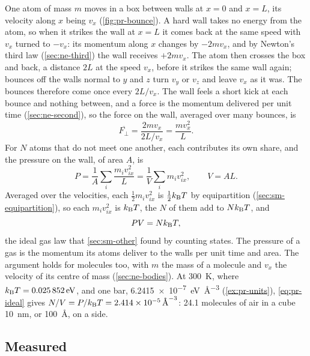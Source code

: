 One atom of mass $m$ moves in a box between walls at $x = 0$ and $x =
L$, its velocity along $x$ being $v_x$ (\cref{fig:pr-bounce}). A hard
wall takes no energy from the atom, so when it strikes the wall at $x =
L$ it comes back at the same speed with $v_x$ turned to $-v_x$: its
momentum along $x$ changes by $-2mv_x$, and by Newton's third law
(\cref{sec:ne-third}) the wall receives $+2mv_x$. The atom then crosses
the box and back, a distance $2L$ at the speed $v_x$, before it strikes
the same wall again; bounces off the walls normal to $y$ and $z$ turn
$v_y$ or $v_z$ and leave $v_x$ as it was. The bounces therefore come once
every $2L/v_x$. The wall feels a short kick at each bounce and nothing
between, and a force is the momentum delivered per unit time
(\cref{sec:ne-second}), so the force on the wall, averaged over many
bounces, is
\begin{equation*}
   \overline{F_\perp} = \frac{2mv_x}{2L/v_x} = \frac{mv_x^2}{L} .
\end{equation*}
For $N$ atoms that do not meet one another, each contributes its own
share, and the pressure on the wall, of area $A$, is
\begin{equation*}
   P = \frac{1}{A}\sum_i\frac{m_iv_{ix}^2}{L} = \frac{1}{V}\sum_i
   m_iv_{ix}^2 , \qquad V = AL .
\end{equation*}
Averaged over the velocities, each $\frac12m_iv_{ix}^2$ is $\frac12k_{\mathrm{B}} T$
by equipartition (\cref{sec:sm-equipartition}), so each $m_iv_{ix}^2$ is
$k_{\mathrm{B}} T$, the $N$ of them add to $Nk_{\mathrm{B}} T$, and
\begin{equation}
   PV = Nk_{\mathrm{B}} T ,
   \label{eq:pr-ideal}
\end{equation}
the ideal gas law that \cref{sec:sm-other} found by counting states. The
pressure of a gas is the momentum its atoms deliver to the walls per unit
time and area. The argument holds for molecules too, with $m$ the mass of
a molecule and $v_x$ the velocity of its centre of mass
(\cref{sec:ne-bodies}). At \SI{300}{\kelvin}, where $k_{\mathrm{B}} T =
\SI{0.025852}{\electronvolt}$, and one bar,
\SI{6.2415e-7}{\electronvolt\per\angstrom\cubed} (\cref{ex:pr-units}),
\cref{eq:pr-ideal} gives $N/V = P/k_{\mathrm{B}} T = \SI{2.414e-5}{\per\angstrom
\cubed}$: 24.1 molecules of air in a cube \SI{10}{\nano\metre}, or
\SI{100}{\angstrom}, on a side.

\subsection*{Measured}

